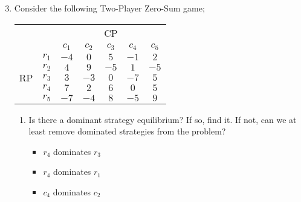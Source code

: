 \documentclass[a4paper, 12pt]{article}
\begin{document}
                \begin{enumerate}[1.]
                    \setcounter{enumi}{2}
                    \itemsep0em
                    \item Consider the following Two-Player Zero-Sum game;
                        \begin{center}
                            \begin{tabular}{|cc|ccccc|}
                                \hline
                                & & \multicolumn{5}{c|}{CP} \\
                                & & $c_1$ & $c_2$ & $c_3$ & $c_4$ & $c_5$ \\
                                \hline
                                \multirow{5}{*}{RP} & $r_1$ & $-4$ & $0$ & $5$ & $-1$ & $2$ \\
                                & $r_2$ & $4$ & $9$ & $-5$ & $1$ & $-5$ \\
                                & $r_3$ & $3$ & $-3$ & $0$ & $-7$ & $5$ \\
                                & $r_4$ & $7$ & $2$ & $6$ & $0$ & $5$ \\
                                & $r_5$ & $-7$ & $-4$ & $8$ & $-5$ & $9$ \\
                                \hline
                            \end{tabular}
                        \end{center}
                        \begin{enumerate}[1.]
                            \item
                                Is there a dominant strategy equilibrium?
                                If so, find it.
                                If not, can we at least remove dominated strategies from the problem?
                                \begin{itemize}
                                    \itemsep0em
                                    \item $r_4$ dominates $r_3$
                                    \item $r_4$ dominates $r_1$
                                    \item $c_4$ dominates $c_2$
                                \end{itemize}
                                \begin{center}
                                    \begin{tabular}{|cc|cccc|}

\end{tabular}
\end{center}
\end{enumerate}
\end{enumerate}
\end{document}
